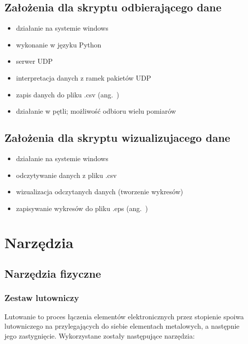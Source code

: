 \subsection*{Założenia dla skryptu odbierającego dane}
\begin{itemize}
    \item działanie na systemie windows
    \item wykonanie w języku Python
    \item serwer UDP
    \item interpretacja danych z ramek pakietów UDP
    \item zapis danych do pliku .csv (ang.~)
    \item działanie w pętli; możliwość odbioru wielu pomiarów
\end{itemize}

\subsection*{Założenia dla skryptu wizualizujacego dane}
\begin{itemize}
    \item działanie na systemie windows
    \item odczytywanie danych z pliku .csv
    \item wizualizacja odczytanych danych (tworzenie wykresów)
    \item zapisywanie wykresów do pliku .eps (ang.~)
\end{itemize}

\newpage

\section{Narzędzia}
\label{ch:narzedzia}
\subsection*{Narzędzia fizyczne}

\subsubsection*{Zestaw lutowniczy} %
Lutowanie to proces łączenia elementów elektronicznych przez stopienie spoiwa lutowniczego na przylegających do siebie elementach metalowych, a następnie jego zastygnięcie. Wykorzystane zostały następujące narzędzia:

